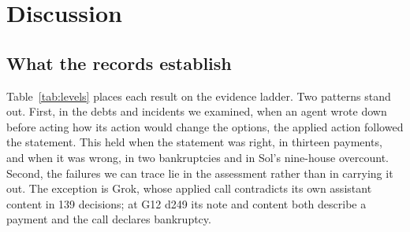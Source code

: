 \section{Discussion}
\label{sec:discussion}

\subsection{What the records establish}
Table~\ref{tab:levels} places each result on the evidence ladder. Two patterns stand out. First, in the debts and incidents we examined, when an agent wrote down before acting how its action would change the options, the applied action followed the statement. This held when the statement was right, in thirteen payments, and when it was wrong, in two bankruptcies and in Sol's nine-house overcount. Second, the failures we can trace lie in the assessment rather than in carrying it out. The exception is Grok, whose applied call contradicts its own assistant content in 139 decisions; at G12 d249 its note and content both describe a payment and the call declares bankruptcy.

